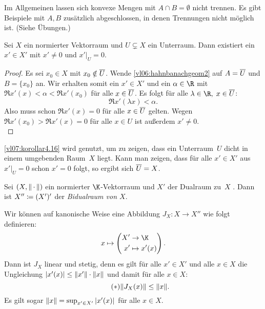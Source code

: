 Im Allgemeinen lassen sich konvexe Mengen mit $A\cap B = \emptyset$ nicht
trennen. Es gibt Beispiele mit $A,B$ zusätzlich abgeschlossen, in denen
Trennungen nicht möglich ist. (Siehe Übungen.)

\begin{thKorollar} \label{vl07:korollar4.16}
    Sei $X$ ein normierter Vektorraum und $U\subsetneq X$ ein Unterraum.
    Dann existiert ein $x'\in X'$ mit $x'\neq 0$ und $x'\vert_U = 0$.
\end{thKorollar}

\begin{proof}
    Es sei $x_0\in X$ mit $x_0\notin \overline{U}$. 
    Wende \cref{vl06:hahnbanachgeom2} auf $A=\overline{U}$ und $B=\{x_0\}$ an.
    Wir erhalten somit ein $x'\in X'$ und ein $\alpha\in\R$ mit $\Re x'(x) <
    \alpha < \Re x'(x_0)$ für alle $x\in\overline{U}$. Es folgt für alle
    $\lambda\in\R,\;x\in\setclosure U$:
    \[ \Re x'(\lambda x) < \alpha  . \]
    Also muss schon $\Re x'(x) = 0$ für alle $x\in\overline{U}$ gelten. Wegen
    $\Re x'(x_0) > \Re x'(x) = 0$ für alle $x\in U$ ist außerdem $x'\neq 0$.
    \\
\end{proof}

\nnBemerkung
\cref{vl07:korollar4.16} wird genutzt, um zu zeigen, dass ein Unterraum~$U$
dicht in einem umgebenden Raum~$X$ liegt. Kann man zeigen, dass für alle
$x'\in X'$ aus $x'\vert_U = 0$ schon $x'=0$ folgt, so ergibt sich
$\overline{U} = X$.

\begin{thDef} \label{vl07:def:JX}
    Sei $(X,\lVert\,\cdot\,\rVert)$ ein normierter $\K$-Vektorraum und $X'$ der Dualraum zu~$X$
    .
    Dann ist $X'' \coloneqq (X')'$ der \emph{Bidualraum von $X$}.
\end{thDef}
    
Wir können auf kanonische Weise eine Abbildung 
$J_X\colon X\to X''$ wie folgt definieren:
\[ x\mapsto \left( 
        \begin{aligned}
            X' &\to \K  \\
            x' &\mapsto x'(x)
        \end{aligned}
    \right)
. \]
Dann ist $J_X$ linear und stetig, denn es gilt für alle $x'\in X'$ und
alle $x\in X$ die Ungleichung
$\lvert x'(x)\rvert \leq \lVert x'\rVert\cdot \lVert x\rVert$ und damit für alle $x\in X$:
\[ \tag{$\ast$} \label{vl07:ast}
    \lVert J_X(x) \rVert \leq \lVert x\rVert  . \]
Es gilt sogar $\lVert x\rVert = \sup_{x'\in X'} \,\lvert x'(x)\rvert$ für alle $x\in X$.

